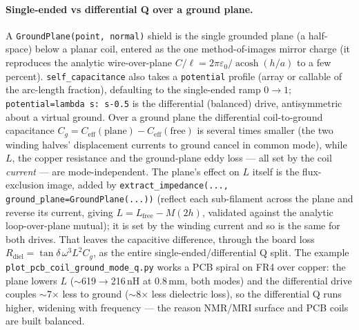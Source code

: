 \documentclass[11pt,oneside]{report}
\newcommand{\code}[1]{\texttt{#1}}
\begin{document}
\paragraph{Single-ended vs differential Q over a ground plane.} A \code{GroundPlane(point,
normal)} shield is the single grounded plane (a half-space) below a planar coil, entered as the
one method-of-images mirror charge (it reproduces the analytic wire-over-plane
\(C/\ell=2\pi\varepsilon_0/\operatorname{acosh}(h/a)\) to a few percent). \code{self\_capacitance}
also takes a \code{potential} profile (array or callable of the arc-length fraction), defaulting
to the single-ended ramp \(0\to1\); \code{potential=lambda s: s-0.5} is the differential
(balanced) drive, antisymmetric about a virtual ground. Over a ground plane the differential
coil-to-ground capacitance \(C_g=C_{\text{eff}}(\text{plane})-C_{\text{eff}}(\text{free})\) is
several times smaller (the two winding halves' displacement currents to ground cancel in common
mode), while \(L\), the copper resistance and the ground-plane eddy loss --- all set by the
coil \emph{current} --- are mode-independent. The plane's effect on \(L\) itself is the
flux-exclusion image, added by \code{extract\_impedance(..., ground\_plane=GroundPlane(...))}
(reflect each sub-filament across the plane and reverse its current, giving \(L=L_{\text{free}}
-M(2h)\), validated against the analytic loop-over-plane mutual); it is set by the winding
current and so is the same for both drives. That leaves the capacitive difference, through the
board loss \(R_{\text{diel}}=\tan\delta\,\omega^3 L^2 C_g\), as the entire
single-ended/differential Q split. The example \code{plot\_pcb\_coil\_ground\_mode\_q.py} works
a PCB spiral on FR4 over copper: the plane lowers \(L\) (\(\sim\)619\(\to\)216\,nH at 0.8\,mm,
both modes) and the differential drive couples \(\sim\)7\(\times\) less to ground
(\(\sim\)8\(\times\) less dielectric loss), so the differential Q runs higher, widening with
frequency --- the reason NMR/MRI surface and PCB coils are built balanced.
\end{document}
